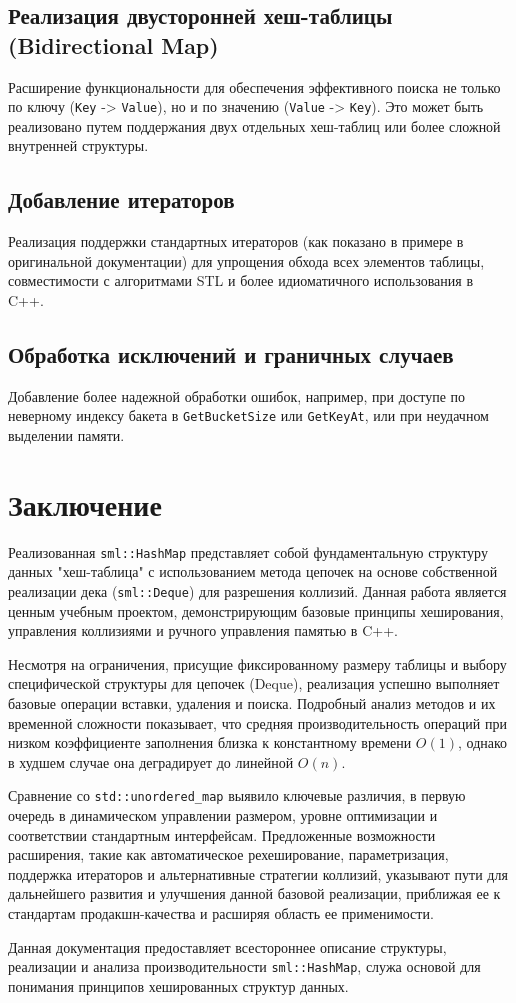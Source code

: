 \documentclass[a4paper,12pt]{article}
\begin{document}
\subsection{Реализация двусторонней хеш-таблицы (Bidirectional Map)}

Расширение функциональности для обеспечения эффективного поиска не только по ключу (\texttt{Key} -> \texttt{Value}), но и по значению (\texttt{Value} -> \texttt{Key}). Это может быть реализовано путем поддержания двух отдельных хеш-таблиц или более сложной внутренней структуры.

\subsection{Добавление итераторов}

Реализация поддержки стандартных итераторов (как показано в примере в оригинальной документации) для упрощения обхода всех элементов таблицы, совместимости с алгоритмами STL и более идиоматичного использования в C++.

\subsection{Обработка исключений и граничных случаев}

Добавление более надежной обработки ошибок, например, при доступе по неверному индексу бакета в \texttt{GetBucketSize} или \texttt{GetKeyAt}, или при неудачном выделении памяти.

\section{Заключение}

Реализованная \texttt{sml::HashMap} представляет собой фундаментальную структуру данных "хеш-таблица" с использованием метода цепочек на основе собственной реализации дека (\texttt{sml::Deque}) для разрешения коллизий. Данная работа является ценным учебным проектом, демонстрирующим базовые принципы хеширования, управления коллизиями и ручного управления памятью в C++.

Несмотря на ограничения, присущие фиксированному размеру таблицы и выбору специфической структуры для цепочек (Deque), реализация успешно выполняет базовые операции вставки, удаления и поиска. Подробный анализ методов и их временной сложности показывает, что средняя производительность операций при низком коэффициенте заполнения близка к константному времени \(O(1)\), однако в худшем случае она деградирует до линейной \(O(n)\).

Сравнение со \texttt{std::unordered\_map} выявило ключевые различия, в первую очередь в динамическом управлении размером, уровне оптимизации и соответствии стандартным интерфейсам. Предложенные возможности расширения, такие как автоматическое рехеширование, параметризация, поддержка итераторов и альтернативные стратегии коллизий, указывают пути для дальнейшего развития и улучшения данной базовой реализации, приближая ее к стандартам продакшн-качества и расширяя область ее применимости.

Данная документация предоставляет всестороннее описание структуры, реализации и анализа производительности \texttt{sml::HashMap}, служа основой для понимания принципов хешированных структур данных.
\end{document}
